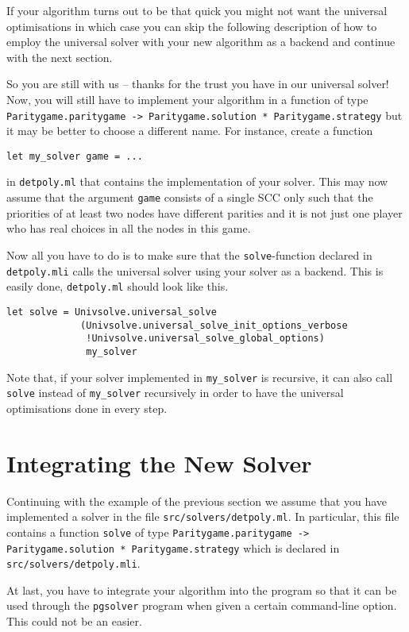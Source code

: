 If your algorithm turns out to be that quick you might not want the universal optimisations in which case you
can skip the following description of how to employ the universal solver with your new algorithm as a backend
and continue with the next section.

So you are still with us -- thanks for the trust you have in our universal solver! Now, you will still have
to implement your algorithm in a function of type
\texttt{Paritygame.paritygame -> Paritygame.solution * Paritygame.strategy} but it may be better to choose
a different name. For instance, create a function
\begin{verbatim}
let my_solver game = ...
\end{verbatim}
in \texttt{detpoly.ml} that contains the implementation of your solver. This may now assume that the argument
\texttt{game} consists of a single SCC only such that the priorities of at least two nodes have different
parities and it is not just one player who has real choices in all the nodes in this game.

Now all you have to do is to make sure that the \texttt{solve}-function declared in \texttt{detpoly.mli}
calls the universal solver using your solver as a backend. This is easily done, \texttt{detpoly.ml} should
look like this.
\begin{verbatim}
let solve = Univsolve.universal_solve
             (Univsolve.universal_solve_init_options_verbose
              !Univsolve.universal_solve_global_options)
              my_solver
\end{verbatim}
Note that, if your solver implemented in \verb#my_solver# is recursive, it can also call \verb#solve# instead
of \verb#my_solver# recursively in order to have the universal optimisations done in every step.


\section{Integrating the New Solver}

Continuing with the example of the previous section we assume that you have implemented a solver in the file
\texttt{src/solvers/detpoly.ml}. In particular, this file contains a function \texttt{solve} of type
\texttt{Paritygame.paritygame -> Paritygame.solution * Paritygame.strategy} which is declared in
\texttt{src/solvers/detpoly.mli}.

At last, you have to integrate your algorithm into the program so that it can be used through the
\texttt{pgsolver} program when given a certain command-line option. This could not be an easier.

